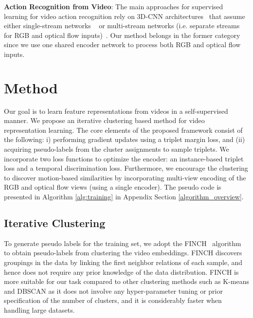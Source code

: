 \documentclass[10pt,twocolumn,letterpaper]{article}
\begin{document}
\textbf{Action Recognition from Video}: The main approaches for supervised learning for video action recognition rely on 3D-CNN architectures~\cite{tran2018closer, feichtenhofer2019slowfast, 3d_conv_spatiotemporal} that assume either single-stream networks ~\cite{Feichtenhofer_2020_CVPR, tran2018closer,xie2018rethinking}
or multi-stream networks (i.e. separate streams for RGB and optical flow inputs)~\cite{dynamonet, simonyan, feichtenhofer2016convolutional, Zhao_2019_CVPR, feichtenhofer2019slowfast}. Our method belongs in the former category since we use one shared encoder network to process both RGB and optical flow inputs.



\section{Method}
\vspace{-0.1cm}
\label{method}
Our goal is to learn feature representations from videos in a self-supervised manner. We propose an iterative clustering based method for video representation learning. The core elements of the proposed framework consist of the following: i) performing gradient updates using a triplet margin loss, and (ii) acquiring pseudo-labels from the cluster assignments to sample triplets. We incorporate two loss functions to optimize the encoder: an instance-based triplet loss and a temporal discrimination loss. Furthermore, we encourage the clustering to discover motion-based similarities by incorporating multi-view encoding of the RGB and optical flow views (using a single encoder). The pseudo code is presented in Algorithm \ref{alg:training} in Appendix Section \ref{algorithm_overview}.

\subsection{Iterative Clustering}
\vspace{-0.1cm}
To generate pseudo labels for the training set, we adopt the FINCH~\cite{finch} algorithm to obtain pseudo-labels from clustering the video embeddings. FINCH discovers groupings in the data by linking the first neighbor relations of each sample, and hence does not require any prior knowledge of the data distribution. FINCH is more suitable for our task compared to other clustering methods such as K-means and DBSCAN \cite{dbscan} as it does not involve any hyper-parameter tuning or prior specification of the number of clusters, and it is considerably faster when handling large datasets.
\end{document}
